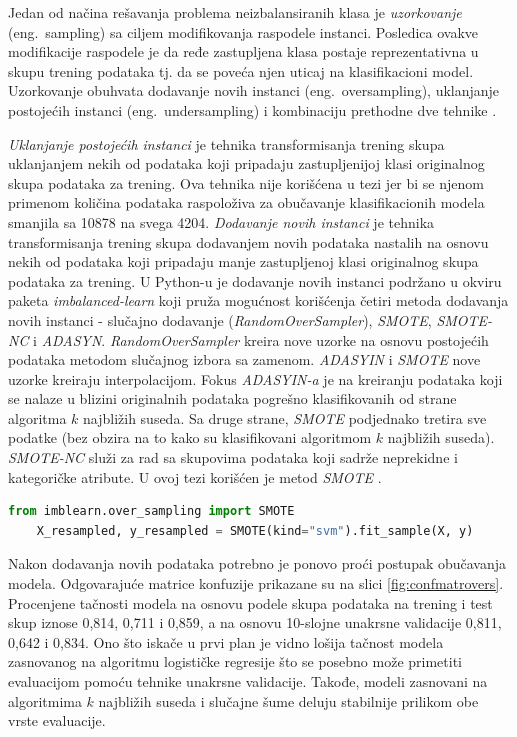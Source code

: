 \documentclass[12pt,oneside]{memoir}
\begin{document}
Jedan od načina rešavanja problema neizbalansiranih klasa je \textit{uzorkovanje} (eng.~sampling) sa ciljem modifikovanja raspodele instanci. Posledica ovakve modifikacije raspodele je da ređe zastupljena klasa postaje reprezentativna u skupu trening podataka tj. da se poveća njen uticaj na klasifikacioni model. Uzorkovanje obuhvata dodavanje novih instanci (eng.~oversampling), uklanjanje postojećih instanci (eng.~undersampling) i kombinaciju prethodne dve tehnike \cite{mitic, aggarwal}. 

\textit{Uklanjanje postojećih instanci} je tehnika transformisanja trening skupa uklanjanjem nekih od podataka koji pripadaju zastupljenijoj klasi originalnog skupa podataka za trening. Ova tehnika nije korišćena u tezi jer bi se njenom primenom količina podataka raspoloživa za obučavanje klasifikacionih modela smanjila sa 10878 na svega 4204.
\textit{Dodavanje novih instanci} je tehnika transformisanja trening skupa dodavanjem novih podataka nastalih na osnovu nekih od podataka koji pripadaju manje zastupljenoj klasi originalnog skupa podataka za trening. U Python-u je dodavanje novih instanci podržano u okviru paketa \textit{imbalanced-learn} koji pruža mogućnost korišćenja četiri metoda dodavanja novih instanci - slučajno dodavanje (\textit{RandomOverSampler}), \textit{SMOTE}, \textit{SMOTE-NC} i \textit{ADASYN}. \textit{RandomOverSampler} kreira nove uzorke na osnovu postojećih podataka metodom slučajnog izbora sa zamenom. \textit{ADASYIN} i \textit{SMOTE} nove uzorke kreiraju interpolacijom. Fokus \textit{ADASYIN-a} je na kreiranju podataka koji se nalaze u blizini originalnih podataka pogrešno klasifikovanih od strane algoritma $k$ najbližih suseda. Sa druge strane, \textit{SMOTE} podjednako tretira sve podatke (bez obzira na to kako su klasifikovani algoritmom $k$ najbližih suseda). \textit{SMOTE-NC} služi za rad sa skupovima podataka koji sadrže neprekidne i kategoričke atribute. U ovoj tezi korišćen je metod \textit{SMOTE} \cite{imblearn, mitic}.

\begin{lstlisting}[language=Python, basicstyle=\tiny]
	from imblearn.over_sampling import SMOTE
	X_resampled, y_resampled = SMOTE(kind="svm").fit_sample(X, y)
\end{lstlisting}

Nakon dodavanja novih podataka potrebno je ponovo proći postupak obučavanja modela. Odgovarajuće matrice konfuzije prikazane su na slici \ref{fig:confmatrovers}. Procenjene tačnosti modela na osnovu podele skupa podataka na trening i test skup iznose 0,814, 0,711 i 0,859, a na osnovu 10-slojne unakrsne validacije 0,811, 0,642 i 0,834. Ono što iskače u prvi plan je vidno lošija tačnost modela zasnovanog na algoritmu logističke regresije što se posebno može primetiti evaluacijom pomoću tehnike unakrsne validacije. Takođe, modeli zasnovani na algoritmima $k$ najbližih suseda i slučajne šume deluju stabilnije prilikom obe vrste evaluacije. 
\end{document}
